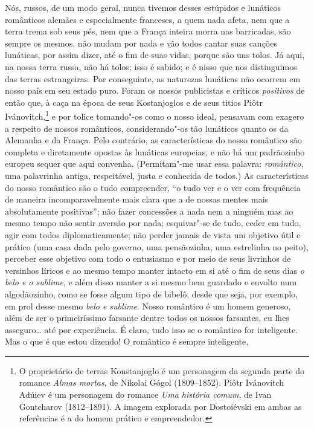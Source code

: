 Nós, russos, de um modo geral, nunca tivemos desses estúpidos e lunáticos
românticos alemães e especialmente franceses, a quem nada afeta, nem que a
terra trema sob seus pés, nem que a França inteira morra nas barricadas, são
sempre os mesmos, não mudam por nada e vão todos cantar suas canções lunáticas,
por assim dizer, até o fim de suas vidas, porque são uns tolos. Já aqui, na
nossa terra russa, não há tolos; isso é sabido; e é nisso que nos distinguimos
das terras estrangeiras. Por conseguinte, as naturezas lunáticas não ocorrem em
nosso país em seu estado puro. Foram os nossos publicistas e críticos
\textit{positivos} de então que, à caça na época de seus Kostanjoglos e de seus titios
Piôtr Ivánovitch,\footnote{ O proprietário de terras Konstanjoglo é um
personagem da segunda parte do romance \textit{Almas mortas}, de Nikolai Gógol
(1809--1852).  Piôtr Ivánovitch Adúiev é um personagem do romance \textit{Uma
história comum}, de Ivan Gontcharov (1812--1891). A imagem explorada por
Dostoiévski em ambas as referências é a do homem prático e empreendedor.} e por
tolice tomando"-os como o nosso ideal, pensavam com exagero a respeito de nossos
românticos, considerando"-os tão lunáticos quanto os da Alemanha e da França.
Pelo contrário, as características do nosso romântico são completa e
diretamente opostas às lunáticas europeias, e não há um padrãozinho europeu
sequer que aqui convenha. (Permitam"-me usar essa palavra: \textit{romântico}, uma
palavrinha antiga, respeitável, justa e conhecida de todos.) As características
do nosso romântico são o tudo compreender, ``o tudo ver e o ver com
frequência de maneira incomparavelmente mais clara que a de nossas mentes mais
absolutamente positivas''; não fazer concessões a nada nem a ninguém mas ao
mesmo tempo não sentir aversão por nada; esquivar"-se de tudo, ceder em tudo,
agir com todos diplomaticamente; não perder jamais de vista um objetivo útil e
prático (uma casa dada pelo governo, uma pensãozinha, uma estrelinha no peito),
perceber esse objetivo com todo o entusiasmo e por meio de seus livrinhos de
versinhos líricos e ao mesmo tempo manter intacto em si até o fim de seus dias
\textit{o belo e o sublime}, e além disso manter a si mesmo bem guardado e envolto num
algodãozinho, como se fosse algum tipo de bibelô, desde que seja, por exemplo,
em prol desse mesmo \textit{belo e sublime}. Nosso romântico é um homem generoso, além
de ser o primeiríssimo farsante dentre todos os nossos farsantes, eu lhes
asseguro\ldots{} até por experiência. É claro, tudo isso se o romântico for
inteligente. Mas o que é que estou dizendo! O romântico é sempre inteligente,
